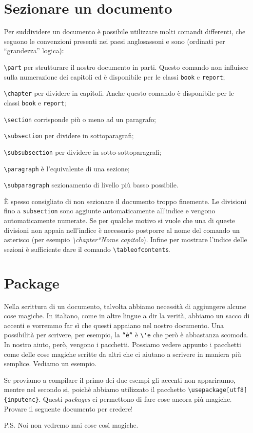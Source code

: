\section{Sezionare un documento}
Per suddividere un documento è possibile utilizzare molti comandi differenti,
che seguono le convenzioni presenti nei paesi anglosassoni e sono (ordinati 
per ``grandezza'' logica):
\begin{description}
    \item \texttt{\textbackslash part} per strutturare il nostro documento in
    parti. Questo comando non influisce sulla numerazione dei capitoli ed è
    disponibile per le classi \texttt{book} e \texttt{report};
    \item \texttt{\textbackslash chapter} per dividere in capitoli. Anche
    questo comando è disponibile per le classi \texttt{book} e \texttt{report};
    \item \texttt{\textbackslash section} corrisponde più o meno ad un 
    paragrafo;
    \item \texttt{\textbackslash subsection} per dividere in sottoparagrafi;
    \item \texttt{\textbackslash subsubsection} per dividere in
    sotto-sottoparagrafi;
    \item \texttt{\textbackslash paragraph} è l'equivalente di una sezione;
    \item \texttt{\textbackslash subparagraph} sezionamento di livello più
    basso possibile.
\end{description}
È spesso consigliato di non sezionare il documento troppo finemente. Le 
divisioni fino a \texttt{subsection} sono aggiunte automaticamente all'indice e
vengono automaticamente numerate. Se per qualche motivo si vuole che una di
queste divisioni non appaia nell'indice è necessario postporre al nome del
comando un asterisco (per esempio \emph{\textbackslash{}chapter*{Nome
capitolo}}). Infine per mostrare l'indice delle sezioni è sufficiente dare il
comando \texttt{\textbackslash tableofcontents}.

\section{Package}
Nella scrittura di un documento, talvolta abbiamo necessità di aggiungere 
alcune cose magiche. In italiano, come in altre lingue a dir la verità, 
abbiamo un sacco di accenti e vorremmo far sì che questi appaiano nel nostro 
documento. Una possibilità per scrivere, per esempio, la \texttt{``è''} è 
\verb!\'e! che però è abbastanza scomoda. In nostro aiuto, però, vengono i 
pacchetti. Possiamo vedere appunto i pacchetti come delle cose magiche scritte 
da altri che ci aiutano a scrivere in maniera più semplice. Vediamo un esempio.


Se proviamo a compilare il primo dei due esempi gli accenti non appariranno, 
mentre nel secondo si, poichè abbiamo utilizzato il pacchetto 
\verb!\usepackage[utf8]{inputenc}!. Questi \textit{packages} ci permettono di 
fare cose ancora più magiche. Provare il seguente documento per credere!

P.S. Noi non vedremo mai cose così magiche.

